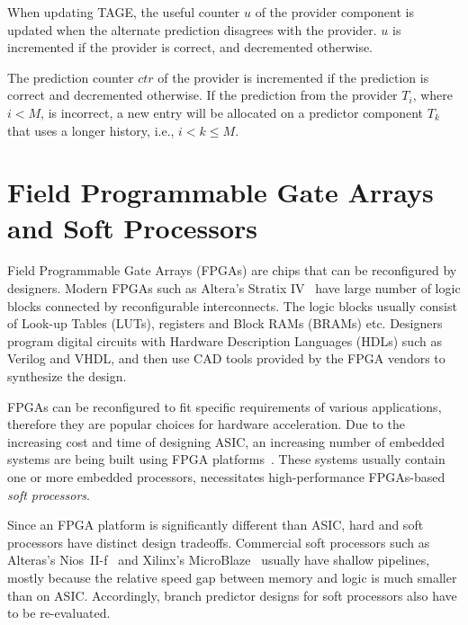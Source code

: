 When updating TAGE, the useful counter $u$ of the provider component is updated when the alternate prediction disagrees with the provider. $u$ is incremented if the provider is correct, and decremented otherwise.

The prediction counter $ctr$ of the provider is incremented if the prediction is correct and decremented otherwise. If the prediction from the provider $T_i$, where $i < M$, is incorrect, a new entry will be allocated on a predictor component $T_k$ that uses a longer history, i.e., $i<k\leq M$.


\section{Field Programmable Gate Arrays and Soft Processors}
\label{sec:background:fpga}
Field Programmable Gate Arrays (FPGAs) are chips that can be reconfigured by designers. Modern FPGAs such as Altera's Stratix IV~\cite{StratixIV} have large number of logic blocks connected by reconfigurable interconnects. The logic blocks usually consist of Look-up Tables (LUTs), registers and Block RAMs (BRAMs) etc. Designers program digital circuits with Hardware Description Languages (HDLs) such as Verilog and VHDL, and then use CAD tools provided by the FPGA vendors to synthesize the design.

FPGAs can be reconfigured to fit specific requirements of various applications, therefore they are popular choices for hardware acceleration. Due to the increasing cost and time of designing ASIC, an increasing number of embedded systems are being built using FPGA platforms~\cite{softprocessor}. These systems usually contain one or more embedded processors, necessitates high-performance FPGAs-based \textit{soft processors}. 

Since an FPGA platform is significantly different than ASIC, hard and soft processors have distinct design tradeoffs. Commercial soft processors such as Alteras's Nios~II-f~\cite{niosiif} and Xilinx's MicroBlaze~\cite{microblaze} usually have shallow pipelines, mostly because the relative speed gap between memory and logic is much smaller than on ASIC. Accordingly, branch predictor designs for soft processors also have to be re-evaluated.



